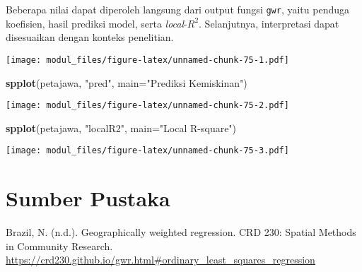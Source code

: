 \documentclass[
]{book}
\newenvironment{Shaded}{\begin{snugshade}}{\end{snugshade}}
\newcommand{\DataTypeTok}[1]{\textcolor[rgb]{0.13,0.29,0.53}{#1}}
\newcommand{\KeywordTok}[1]{\textcolor[rgb]{0.13,0.29,0.53}{\textbf{#1}}}
\newcommand{\NormalTok}[1]{#1}
\newcommand{\OperatorTok}[1]{\textcolor[rgb]{0.81,0.36,0.00}{\textbf{#1}}}
\newcommand{\StringTok}[1]{\textcolor[rgb]{0.31,0.60,0.02}{#1}}
\begin{document}
Beberapa nilai dapat diperoleh langsung dari output fungsi \texttt{gwr}, yaitu penduga koefisien, hasil prediksi model, serta \emph{local}-\(R^2\). Selanjutnya, interpretasi dapat disesuaikan dengan konteks penelitian.

\begin{Shaded}
\end{Shaded}

\texttt{[image: modul\_files/figure-latex/unnamed-chunk-75-1.pdf]}

\begin{Shaded}
\begin{Highlighting}[]
\KeywordTok{spplot}\NormalTok{(petajawa, }\StringTok{"pred"}\NormalTok{, }\DataTypeTok{main=}\StringTok{"Prediksi Kemiskinan"}\NormalTok{)}
\end{Highlighting}
\end{Shaded}

\texttt{[image: modul\_files/figure-latex/unnamed-chunk-75-2.pdf]}

\begin{Shaded}
\begin{Highlighting}[]
\KeywordTok{spplot}\NormalTok{(petajawa, }\StringTok{"localR2"}\NormalTok{, }\DataTypeTok{main=}\StringTok{"Local R{-}square"}\NormalTok{)}
\end{Highlighting}
\end{Shaded}

\texttt{[image: modul\_files/figure-latex/unnamed-chunk-75-3.pdf]}

\hypertarget{sumber-pustaka-2}{%
\section{Sumber Pustaka}\label{sumber-pustaka-2}}

Brazil, N. (n.d.). Geographically weighted regression. CRD 230: Spatial Methods in Community Research. \url{https://crd230.github.io/gwr.html\#ordinary_least_squares_regression}
\end{document}
